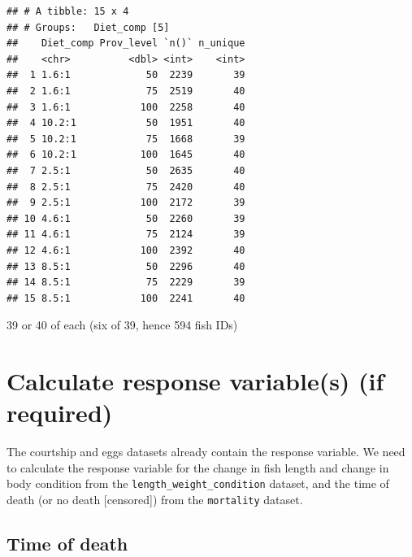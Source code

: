 \documentclass[]{book}
\begin{document}
\begin{verbatim}
## # A tibble: 15 x 4
## # Groups:   Diet_comp [5]
##    Diet_comp Prov_level `n()` n_unique
##    <chr>          <dbl> <int>    <int>
##  1 1.6:1             50  2239       39
##  2 1.6:1             75  2519       40
##  3 1.6:1            100  2258       40
##  4 10.2:1            50  1951       40
##  5 10.2:1            75  1668       39
##  6 10.2:1           100  1645       40
##  7 2.5:1             50  2635       40
##  8 2.5:1             75  2420       40
##  9 2.5:1            100  2172       39
## 10 4.6:1             50  2260       39
## 11 4.6:1             75  2124       39
## 12 4.6:1            100  2392       40
## 13 8.5:1             50  2296       40
## 14 8.5:1             75  2229       39
## 15 8.5:1            100  2241       40
\end{verbatim}

39 or 40 of each (six of 39, hence 594 fish IDs)

\hypertarget{calculate-response-variables-if-required}{%
\section{Calculate response variable(s) (if required)}\label{calculate-response-variables-if-required}}

The courtship and eggs datasets already contain the response variable.
We need to calculate the response variable for the change in fish length and change in body condition from the \texttt{length\_weight\_condition} dataset, and the time of death (or no death {[}censored{]}) from the \texttt{mortality} dataset.

\hypertarget{time-of-death}{%
\subsection{Time of death}\label{time-of-death}}
\end{document}
